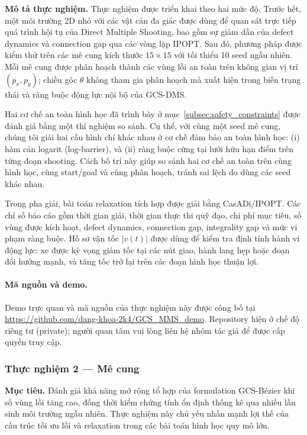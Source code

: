 \textbf{Mô tả thực nghiệm.}
Thực nghiệm được triển khai theo hai mức độ. Trước hết, một môi trường 2D nhỏ với các vật cản đa giác được dùng để quan sát trực tiếp quá trình hội tụ của Direct Multiple Shooting, bao gồm sự giảm dần của defect dynamics và connection gap qua các vòng lặp IPOPT. Sau đó, phương pháp được kiểm thử trên các mê cung kích thước $15\times 15$ với tối thiểu 10 seed ngẫu nhiên. Mỗi mê cung được phân hoạch thành các vùng lồi an toàn trên không gian vị trí $(p_x,p_y)$; chiều góc $\theta$ không tham gia phân hoạch mà xuất hiện trong biến trạng thái và ràng buộc động lực nội bộ của GCS-DMS.

Hai cơ chế an toàn hình học đã trình bày ở mục~\ref{subsec:safety_constraints}
được đánh giá bằng một thí nghiệm so sánh. Cụ thể, với cùng một seed mê cung,
chúng tôi giải hai cấu hình chỉ khác nhau ở cơ chế đảm bảo an toàn hình học:
(i) hàm cản logarit (log-barrier), và (ii) ràng buộc cứng tại lưới hữu hạn điểm
trên từng đoạn shooting. Cách bố trí này giúp so sánh hai cơ chế an toàn trên
cùng hình học, cùng start/goal và cùng phân hoạch, tránh sai lệch do dùng các
seed khác nhau.

Trong pha giải, bài toán relaxation tích hợp được giải bằng CasADi/IPOPT. Các
chỉ số báo cáo gồm thời gian giải, thời gian thực thi quỹ đạo, chi phí mục
tiêu, số vùng được kích hoạt, defect dynamics, connection gap, integrality gap
và mức vi phạm ràng buộc. Hồ sơ vận tốc $|v(t)|$ được dùng để kiểm tra định
tính hành vi động lực: xe được kỳ vọng giảm tốc tại các nút giao, hành lang hẹp
hoặc đoạn đổi hướng mạnh, và tăng tốc trở lại trên các đoạn hình học thuận lợi.

\paragraph*{Mã nguồn và demo.}
Demo trực quan và mã nguồn của thực nghiệm này được công bố tại
\url{https://github.com/dang-khoa-2k4/GCS_MMS_demo}.
Repository hiện ở chế độ riêng tư (private); người quan tâm vui lòng liên hệ
nhóm tác giả để được cấp quyền truy cập.

\subsubsection{Thực nghiệm 2 — Mê cung}

\label{subsubsec:scenario_B}

\textbf{Mục tiêu.}
Đánh giá khả năng mở rộng tổ hợp của formulation GCS-Bézier khi số vùng lồi tăng cao, đồng thời kiểm chứng tính ổn định thống kê qua nhiều lần sinh môi trường ngẫu nhiên. Thực nghiệm này chủ yếu nhấn mạnh lợi thế của cấu trúc tối ưu lồi và relaxation trong các bài toán hình học quy mô lớn.

